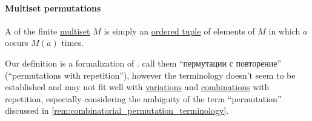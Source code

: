 \paragraph{Multiset permutations}

\begin{definition}\label{def:multiset_permutation}\mimprovised
  A  of the finite \hyperref[def:multiset]{multiset} \( M \) is simply an \hyperref[def:ordered_tuple]{ordered tuple} of elements of \( M \) in which \( a \) occurs \( M(a) \) times.
\end{definition}
\begin{comments}
  \item Our definition is a formalization of \textcite[\S 5.1.2]{Knuth1998ArtVol3}. \Textcite[28]{ДимитровЯнев2007ВероятностиИСтатистика} call them \enquote{пермутации с повторение} (\enquote{permutations with repetition}), however the terminology doesn't seem to be established and may not fit well with \hyperref[def:combinatorial_variation]{variations} and \hyperref[def:combinatorial_combination]{combinations} with repetition, especially considering the ambiguity of the term \enquote{permutation} discussed in \cref{rem:combinatorial_permutation_terminology}.
\end{comments}

